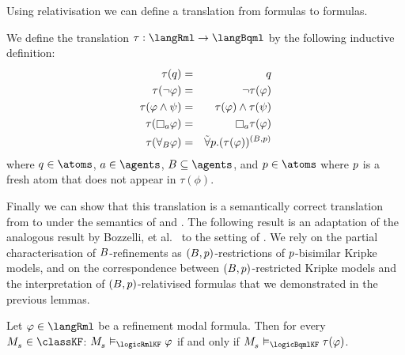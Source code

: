 Using relativisation we can define a translation from \langRml{} formulas to \langBqml{} formulas.

\begin{definition}
We define the translation $\tau : \langRml \to \langBqml$ by the following inductive definition:
\begin{eqnarray*}
    \tau(\atomQ) &=& \atomQ\\
    \tau(\lnot \phi) &=& \lnot \tau(\phi)\\
    \tau(\phi \land \psi) &=& \tau(\phi) \land \tau(\psi)\\
    \tau(\necessaryA \phi) &=& \necessaryA \tau(\phi)\\
    \tau(\allrefsBs \phi) &=& \allbisimsP (\tau(\phi))^{(\agentsB, \atomP)}
\end{eqnarray*}
where $\atomQ \in \atoms$, $\agentA \in \agents$, $\agentsB \subseteq \agents$, and $\atomP \in \atoms$ where $p$ is a fresh atom that does not appear in $\tau(\phi)$.
\end{definition}

Finally we can show that this translation is a semantically correct translation from \langRml{} to \langBqml{} under the semantics of \logicRmlKF{} and \logicBqmlKF{}.
The following result is an adaptation of the analogous result by Bozzelli, et al.~\cite{bozzelli:2014b} to the setting of \classKF{}.
We rely on the partial characterisation of $B$-refinements as $(B, p)$-restrictions of $p$-bisimilar Kripke models, and on the correspondence between $(B, p)$-restricted Kripke models and the interpretation of $(B, p)$-relativised formulas that we demonstrated in the previous lemmas.

\begin{theorem}\label{rml-k4-bqml-translation}
Let $\phi \in \langRml$ be a refinement modal formula.
Then for every $\kPModel{\kStateS} \in \classKF$: $\kPModel{\kStateS} \entails_\logicRmlKF \phi$ if and only if $\kPModel{\kStateS} \entails_\logicBqmlKF \tau(\phi)$.
\end{theorem}

